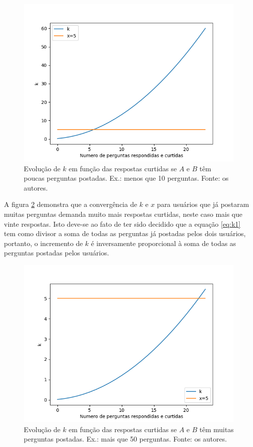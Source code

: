 \begin{figure}[!htb]
\centering
\includegraphics[width=14cm]{poucasquestoes.png}
\caption{Evolução de $k$ em função das respostas curtidas se $A$ e $B$ têm poucas perguntas postadas. Ex.: menos que 10 perguntas. Fonte: os autores.}
\label{fig:poucasquestoes}
\end{figure}

A figura \ref{fig:muitasquestoes}  demonstra que a convergência de $k$ e $x$ para usuários que já postaram muitas perguntas demanda muito mais respostas curtidas, neste caso mais que vinte respostas. Isto deve-se ao fato de ter sido decidido que a equação \ref{eq:k1} tem como divisor a soma de todas as perguntas já postadas pelos dois usuários, portanto, o incremento de $k$ é inversamente proporcional à soma de todas as perguntas postadas pelos usuários. 

\begin{figure}[!htb]
\centering
\includegraphics[width=14cm]{muitasquestoes.png}
\caption{Evolução de $k$ em função das respostas curtidas se $A$ e $B$ têm muitas perguntas postadas. Ex.: mais que 50 perguntas. Fonte: os autores.}
\label{fig:muitasquestoes}
\end{figure}

